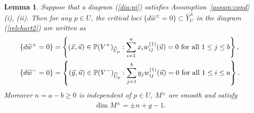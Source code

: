\documentclass[11pt]{amsart}
\theoremstyle{plain}
\newtheorem{lem}[thm]{Lemma}
\begin{document}
\begin{lem}\label{lem:smooth}
Suppose that a diagram (\ref{dia:pi})
satisfies Assumption~\ref{assum:cond} (i), (ii). 
Then for any $p \in U$, the critical 
loci $\{d \widehat{w}^{\pm}=0\} \subset \widehat{Y}_U^{\pm}$
in the diagram (\ref{relchart2})
are written as 
\begin{align}\label{write:M2}
&\{d\widehat{w}^+=0\}=\left\{(\vec{x}, \vec{u}) 
\in \mathbb{P}(V^{+})_{\widehat{U}_p} : 
\sum_{i=1}^a x_i w_{ij}^{(1)}(\vec{u})=0
\mbox{ for all }
1\le j\le b\right\}, \\
\notag
&\{d\widehat{w}^-=0\}
=\left\{(\vec{y}, \vec{u}) \in \mathbb{P}(V^{-})_{\widehat{U}_p} : 
\sum_{j=1}^b y_j w_{ij}^{(1)}(\vec{u})=0 \mbox{ for all }
1\le i\le a\right\}.
\end{align}
Moreover 
$n =a-b \ge 0$ is independent of $p \in U$, 
$M^{\pm}$ are smooth 
and satisfy
\begin{align*}
\dim M^{\pm}=\pm n+g-1.
\end{align*}
\end{lem}
\end{document}
